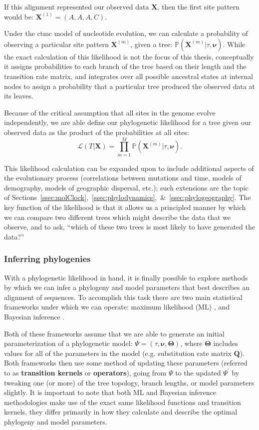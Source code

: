 If this alignment represented our observed data $\mathbf{X}$, then the first site pattern would be: $\mathbf{X}^{(1)} = (A, A, A, C)$.

Under the \gls{ctmc} model of nucleotide evolution, we can calculate a probability of observing a particular site pattern $\mathbf{X}^{(m)}$, given a tree: $\mathbb{P}(\mathbf{X}^{(m)} | \tau, \mathbf{\nu})$.
While the exact calculation of this likelihood is not the focus of this thesis, conceptually it assigns probabilities to each branch of the tree based on their length and the transition rate matrix, and integrates over all possible ancestral states at internal nodes to assign a probability that a particular tree produced the observed data at its leaves.

Because of the critical assumption that all sites in the genome evolve independently, we are able define our phylogenetic likelihood for a tree given our observed data as the product of the probabilities at all sites:
\begin{equation}\label{eq:likelihood}
  \mathcal{L}(T | \mathbf{X}) = \prod_{m=1}^M \mathbb{P}(\mathbf{X}^{(m)} | \tau, \mathbf{\nu}). 
\end{equation}

This likelihood calculation can be expanded upon to include additional aspects of the evolutionary process (correlations between mutations and time, models of demography, models of geographic dispersal, etc.); such extensions are the topic of Sections~\ref{ssec:molClock},~\ref{ssec:phylodynamics},~\&~\ref{ssec:phylogeography}.
The key function of the likelihood is that it allows us a principled manner by which we can compare two different trees which might describe the data that we observe, and to ask, ``which of these two trees is most likely to have generated the data?''

\subsubsection{Inferring phylogenies}
With a phylogenetic likelihood in hand, it is finally possible to explore methods by which we can infer a phylogeny and model parameters that best describes an alignment of sequences.
To accomplish this task there are two main statistical frameworks under which we can operate: maximum likelihood (ML) \citep{hasegawa1991maximum}, and Bayesian inference \citep{suchard2018bayesian}.

Both of these frameworks assume that we are able to generate an initial parameterization of a phylogenetic model: $\Psi = (\tau, \mathbf{\nu}, \mathbf{\Theta})$, where $\mathbf{\Theta}$ includes values for all of the parameters in the model (e.g. substitution rate matrix $\mathbf{Q}$).
Both frameworks then use some method of updating these parameters (referred to as \textbf{transition kernels} or \textbf{operators}), going from $\Psi$ to the updated $\Psi^{\prime}$ by tweaking one (or more) of the tree topology, branch lengths, or model parameters slightly.
It is important to note that both ML and Bayesian inference methodologies make use of the exact same likelihood functions and transition kernels, they differ primarily in how they calculate and describe the optimal phylogeny and model parameters.


